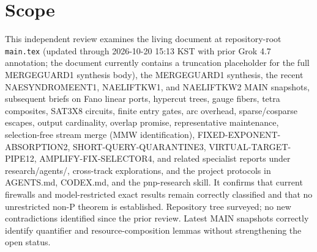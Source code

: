 \documentclass[11pt]{article}
\begin{document}
\section{Scope}
This independent review examines the living document at repository-root \texttt{main.tex} (updated through 2026-10-20 15:13 KST with prior Grok 4.7 annotation; the document currently contains a truncation placeholder for the full MERGEGUARD1 synthesis body), the MERGEGUARD1 synthesis, the recent NAESYNDROMEENT1, NAELIFTKW1, and NAELIFTKW2 MAIN snapshots, subsequent briefs on Fano linear ports, hypercut trees, gauge fibers, tetra composites, SAT3X8 circuits, finite entry gates, arc overhead, sparse/cosparse escapes, output cardinality, overlap promise, representative maintenance, selection-free stream merge (MMW identification), FIXED-EXPONENT-ABSORPTION2, SHORT-QUERY-QUARANTINE3, VIRTUAL-TARGET-PIPE12, AMPLIFY-FIX-SELECTOR4, and related specialist reports under research/agents/, cross-track explorations, and the project protocols in AGENTS.md, CODEX.md, and the pnp-research skill. It confirms that current firewalls and model-restricted exact results remain correctly classified and that no unrestricted non-P theorem is established. Repository tree surveyed; no new contradictions identified since the prior review. Latest MAIN snapshots correctly identify quantifier and resource-composition lemmas without strengthening the open status.
\end{document}

